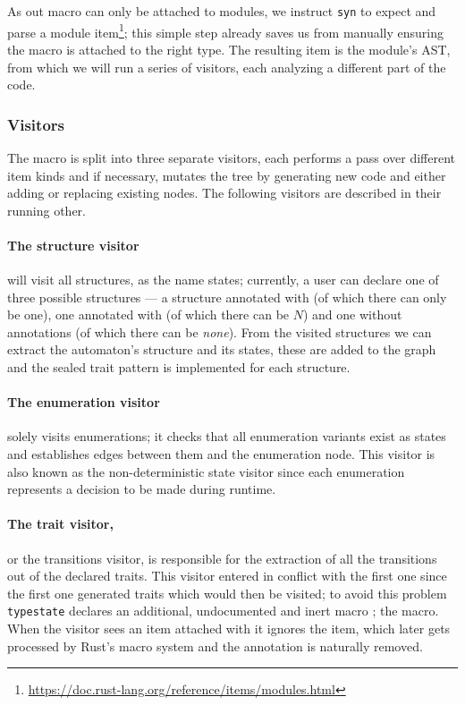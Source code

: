 As out macro can only be attached to modules,
we instruct \texttt{syn} to expect and parse a module item\footnote{\url{https://doc.rust-lang.org/reference/items/modules.html}};
this simple step already saves us from manually ensuring the macro is attached to the right type.
The resulting item is the module's \gls{AST}, from which we will run a series of visitors,
each analyzing a different part of the code. %

\subsubsection{Visitors}\label{sec:macro-dsl:architecture:visitors}

The macro is split into three separate visitors, each performs a pass over different item kinds and if necessary,
mutates the tree by generating new code and either adding or replacing existing nodes.
The following visitors are described in their running other.

\paragraph{The structure visitor} will visit all structures, as the name states;
currently, a user can declare one of three possible structures ---
a structure annotated with  (of which there can only be one),
one annotated with  (of which there can be $N$)
and one without annotations (of which there can be \emph{none}).
From the visited structures we can extract the automaton's structure and its states,
these are added to the graph and the sealed trait pattern is implemented for each structure.

\paragraph{The enumeration visitor} solely visits enumerations;
it checks that all enumeration variants exist as states and establishes edges between them and the enumeration node.
This visitor is also known as the non-deterministic state visitor since each enumeration represents a decision to be made during runtime.

\paragraph{The trait visitor,} or the transitions visitor,
is responsible for the extraction of all the transitions out of the declared traits.
This visitor entered in conflict with the first one since the first one generated traits which would then be visited;
to avoid this problem \texttt{typestate} declares an additional, undocumented and inert macro ;
the  macro.
When the visitor sees an item attached with  it ignores the item,
which later gets processed by Rust's macro system and the annotation is naturally removed. %

